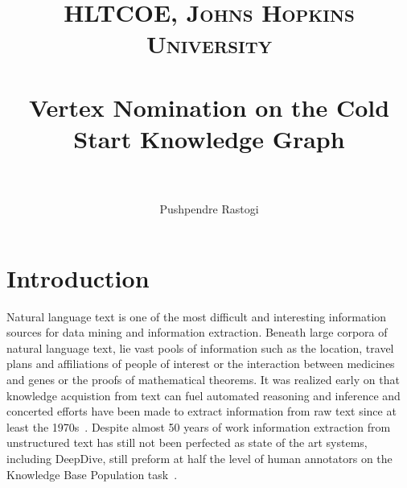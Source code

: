 \documentclass[paper=a4,fontsize=11pt]{scrartcl}
\title{
  \usefont{OT1}{bch}{b}{n}
  \normalfont\normalsize\textsc{HLTCOE, Johns Hopkins University}\\[25pt]
  \horrule{0.5pt}\\[0.4cm]
  \huge Vertex Nomination on the Cold Start Knowledge Graph\\
  \horrule{2pt}\\[0.5cm]
}
\author{
  \normalfont\normalsize
  Pushpendre Rastogi\\
}
\date{}
\numberwithin{equation}{section}    %
\numberwithin{figure}{section}      %
\numberwithin{table}{section}       %
\begin{document}
\maketitle
\section{Introduction}
Natural language text is one of the most difficult and interesting 
information  sources for data mining and information extraction.
Beneath large corpora of natural language text, lie vast pools of information
such as the location, travel plans and affiliations of people of interest
or the interaction between medicines and genes or the proofs of mathematical 
theorems. It was realized early on that knowledge acquistion from text can fuel 
automated reasoning and inference and concerted efforts have been made to 
extract information from raw text since at least the 1970s~\cite{1970TechReports}. 
Despite almost 50 years of work information extraction from unstructured text has
still not been perfected as state of the art systems, including DeepDive, 
still preform at half the level of human annotators on the Knowledge
Base Population task~\cite{Surdenaue}.
\end{document}
